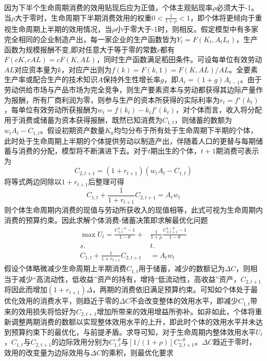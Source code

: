 \documentclass[supercite]{HustGraduPaper}
\begin{document}
    因为下半个生命周期消费的效用贴现后应为正值，个体主观贴现率$\rho$必须大于-1。当$\rho$大于零时，生命周期下半期消费效用的权重$0<\frac{1}{1+\rho}<1$，即个体将更倾向于重视生命周期上半期的效用情况，当$\rho$小于零大于-1时，则相反。假定模型中有多家完全相同的企业制造产出，每一家企业的生产函数皆为$Y_{t}=F(K_{t},A_{t}L_{t})$，生产函数为规模报酬不变,即对任意大于等于零的常数$c$都有$F(cK,cAL)=cF(K,AL)$，同时生产函数满足稻田条件。可设每单位有效劳动$AL$对应资本量为$k$，对应产出则为$f(k)=F(k,1)=F(K,AL)/AL$。全要素生产率或配合生产的技术知识$A$保持外生性增长率$g$，即$A_{t}=(1+g)A_{t-1}$。由于劳动供给市场与产品市场为完全竞争，则生产要素资本与劳动都获得其边际产量作为报酬，所有厂商利润为零，则参与生产的资本所获得的实际利率为$r_t=f'(k_t)$，每单位有效劳动所获报酬为$w_t=f(k_t)-k_tf'(k_t)$，对个体而言，收入将分配用于消费或储蓄为资本获得报酬，既然已知消费为$C_{1,t}$，则储蓄的数额为$w_tA_t-C_{1,t}$。假设初期资产数量$K_0$均匀分布于所有处于生命周期下半期的个体，此时处于生命周期上半期的个体提供劳动以制造产出，伴随着人口的更替与每期储蓄与消费的分配，模型将不断演进下去。对于$t$期出生的个体，$t+1$期消费可表示为
    \begin{equation}
    C_{2,t+1}=(1+r_{t+1})(w_tA_t-C_{1,t})
    \end{equation}
    将等式两边同除以$1+r_{t+1}$后整理可得
    \begin{equation}
    C_{1,t}+\frac{1}{1+r_{t+1}}C_{2,t+1}=A_{t}w_{t}
    \end{equation}
    则个体生命周期内消费的现值与劳动所获收入的现值相等，此式可视为生命周期内消费的预算约束。因此求解个体消费-储蓄决策即求解最优化问题
    \begin{equation}
    \begin{aligned}
    \max U_{t}=\frac{C_{1,t}^{1-\theta}-1}{1-\theta}+&\frac{1}{1+\rho}\frac{C_{2,t+1}^{1-\theta}-1}{1-\theta}\\
    s.&t.\\
    C_{1,t}+\frac{1}{1+r_{t+1}}C_{2,t+1}&=A_{t}w_{t}
    \end{aligned}
    \end{equation}
    假设个体略微减少生命周期上半期消费$C_{1,t}$用于储蓄，减少的数额记为$\Delta C$，则相当于减少“高流动性，低收益”资产的持有，增持“低流动性，高收益”资产，$C_{2,t+1}$将因此而增加$(1+r_{t+1})\Delta$，两期的消费依旧满足预算约束。可知如个体处于最优化效用的消费水平，则趋近于零的$\Delta C$不会改变整体的效用水平，即减少$C_{1,t}$带来的效用损失将恰好为$C_{2,t+1}$增加所带来的效用增益所弥补。如非如此，个体将重新调整两期消费的数额以实现整体效用水平的上升，即此时个体的效用水平并未达到预算约束下的最优化，与前提矛盾。求导可知，对于生命周期内整体效用水平$U_{t}$，$C_{1,t}$与$C_{2,t+1}$的边际效用分别为$C_{1,t}^{-\theta}$与$[1/(1+\rho)]C_{2,t+1}^{-\theta}$。$\Delta C$趋近于零时，效用的改变量为边际效用与$\Delta C$的乘积，则最优化要求
\end{document}
